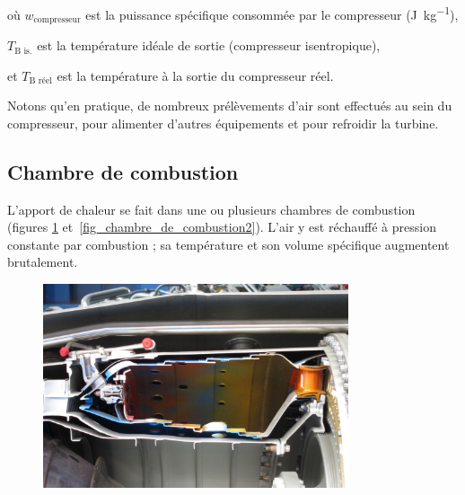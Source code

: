 		\begin{equationterms}
			\item où \tab $w_\text{compresseur}$ \tab est la puissance spécifique consommée par le compresseur (\si{\joule\per\kilogram}),
			\item 	\tab $T_\text{B is.}$ \tab\tab\tab\tab est la température idéale de sortie (compresseur isentropique),
			\item et \tab $T_\text{B réel}$ \tab\tab\tab est la température à la sortie du compresseur réel.
		\end{equationterms}

		Notons qu’en pratique, de nombreux prélèvements d’air sont effectués au sein du compresseur, pour alimenter d’autres équipements et pour refroidir la turbine.



	\subsection{Chambre de combustion}

		L’apport de chaleur se fait dans une ou plusieurs chambres de combustion (figures \ref{fig_chambre_de_combustion1} et~\ref{fig_chambre_de_combustion2}). L’air y est réchauffé à pression constante par combustion ; sa température et son volume spécifique augmentent brutalement.

		\begin{figure}
			\begin{center}
				\includegraphics[width=9cm]{images/photo_chambre_combustion.jpg}
			\end{center}
			\label{fig_chambre_de_combustion1}
		\end{figure}

